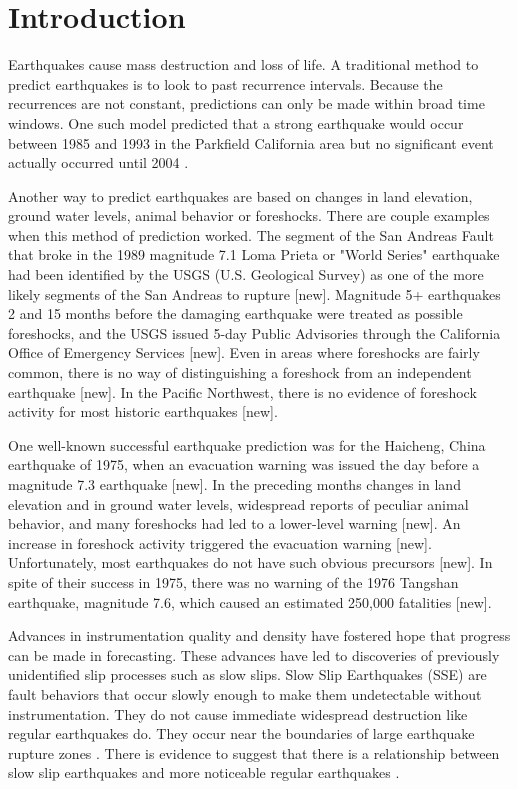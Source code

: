 \documentclass[]{llncs} %
\begin{document}
\section{Introduction}
Earthquakes cause mass destruction and loss of life. A traditional method to predict earthquakes is to look to past recurrence intervals. Because the recurrences are not constant, predictions can only be made within broad time windows. One such model predicted that a strong earthquake would occur between 1985 and 1993 in the Parkfield California area but no significant event actually occurred until 2004 \cite{Jackson}. \par
Another way to predict earthquakes are based on changes in land elevation, ground water levels, animal behavior or foreshocks. There are couple examples when this method of prediction worked. The segment of the San Andreas Fault that broke in the 1989 magnitude 7.1 Loma Prieta or "World Series" earthquake had been identified by the USGS (U.S. Geological Survey) as one of the more likely segments of the San Andreas to rupture [new]. Magnitude 5+ earthquakes 2 and 15 months before the damaging earthquake were treated as possible foreshocks, and the USGS issued 5-day Public Advisories through the California Office of Emergency Services [new]. Even in areas where foreshocks are fairly common, there is no way of distinguishing a foreshock from an independent earthquake [new]. In the Pacific Northwest, there is no evidence of foreshock activity for most historic earthquakes [new].\par
One well-known successful earthquake prediction was for the Haicheng, China earthquake of 1975, when an evacuation warning was issued the day before a magnitude 7.3 earthquake [new]. In the preceding months changes in land elevation and in ground water levels, widespread reports of peculiar animal behavior, and many foreshocks had led to a lower-level warning [new]. An increase in foreshock activity triggered the evacuation warning [new]. Unfortunately, most earthquakes do not have such obvious precursors [new]. In spite of their success in 1975, there was no warning of the 1976 Tangshan earthquake, magnitude 7.6, which caused an estimated 250,000 fatalities [new].\par
Advances in instrumentation quality and density have fostered hope that progress can be made in forecasting. These advances have led to discoveries of previously unidentified slip processes such as slow slips. Slow Slip Earthquakes (SSE) are fault behaviors that occur slowly enough to make them undetectable without instrumentation. They do not cause immediate widespread destruction like regular earthquakes do. They occur near the boundaries of large earthquake rupture zones \cite{Slip}. There is evidence to suggest that there is a relationship between slow slip earthquakes and more noticeable regular earthquakes \cite{SlowSlip}. \par
\end{document}

